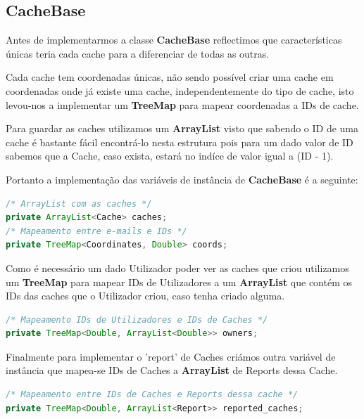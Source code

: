 \documentclass{article}
\begin{document}
\subsection{CacheBase}
\par Antes de implementarmos a classe \textbf{CacheBase} reflectimos que características únicas teria cada cache para a 
diferenciar de todas as outras.
\par Cada cache tem coordenadas únicas, não sendo possível criar uma cache em coordenadas onde já existe uma cache, 
independentemente do tipo de cache, isto levou-nos a implementar um \textbf{TreeMap} para mapear coordenadas a 
IDs de cache.
\par Para guardar as caches utilizamos um \textbf{ArrayList} visto que sabendo o ID de uma cache é bastante fácil encontrá-lo 
nesta estrutura pois para um dado valor de ID sabemos que a Cache, caso exista, estará no indíce de valor igual a (ID - 1).
\par Portanto a implementação das variáveis de instância de \textbf{CacheBase} é a seguinte:
\begin{lstlisting}[language=Java]
/* ArrayList com as caches */
private ArrayList<Cache> caches;
/* Mapeamento entre e-mails e IDs */
private TreeMap<Coordinates, Double> coords;
\end{lstlisting}

\par Como é necessário um dado Utilizador poder ver as caches que criou utilizamos um \textbf{TreeMap} para mapear 
IDs de Utilizadores a um \textbf{ArrayList} que contém os IDs das caches que o Utilizador criou, caso tenha criado alguma.
\begin{lstlisting}[language=Java]
/* Mapeamento IDs de Utilizadores e IDs de Caches */
private TreeMap<Double, ArrayList<Double>> owners;
\end{lstlisting}

\par Finalmente para implementar o 'report' de Caches criámos outra variável de instância que mapea-se IDs de Caches 
a \textbf{ArrayList} de Reports dessa Cache.
\begin{lstlisting}[language=Java]
/* Mapeamento entre IDs de Caches e Reports dessa cache */
private TreeMap<Double, ArrayList<Report>> reported_caches;
\end{lstlisting}

\newpage
\end{document}
